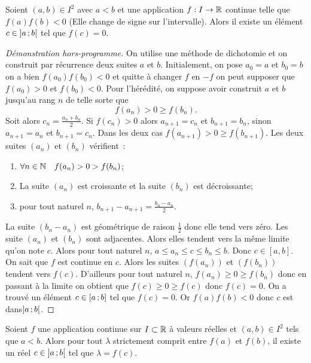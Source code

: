 \begin{theo}
  Soient \((a,b) \in I^2\) avec \(a<b\) et une application \(f:I\rightarrow \mathbb{R}\)
  continue telle que \(f(a) f(b) < 0\) (Elle change de signe sur l'intervalle).
  Alors il existe un élément \(c \in \left] a \, ; {} b \right[\) tel que \(f(c)=0\).
\end{theo}
\begin{proof}[Démonstration hors-programme]
  On utilise une méthode de dichotomie et on construit par récurrence deux
  suites \(a\) et \(b\). Initialement, on pose \(a_0=a\) et \(b_0=b\) on a bien
  \(f(a_0)f(b_0) < 0\) et quitte à changer \(f\) en \(-f\) on peut supposer que
  \(f(a_0)>0\) et \(f(b_0)<0\). Pour l'hérédité, on suppose avoir construit
  \(a\) et \(b\) jusqu'au rang \(n\) de telle sorte que
  \begin{equation}
    f(a_n) > 0 \geqslant f(b_n).
  \end{equation}
  Soit alors \(c_n=\frac{a_n+b_n}{2}\). Si \(f(c_n) >0\) alors \(a_{n+1}=c_n\)
  et \(b_{n+1}=b_n\), sinon \(a_{n+1}=a_n\) et \(b_{n+1}=c_n\). Dans les deux
  cas \(f(a_{n+1})> 0 \geqslant f(b_{n+1})\). Les deux suites \((a_n)\) et
  \((b_n)\) vérifient~:
  \begin{enumerate}
    \item \(\forall n \in \mathbb{N} \quad f(a_n) > 0 > f(b_n)\);
    \item La suite \((a_n)\) est croissante et la suite \((b_n)\) est
      décroissante;
  \item pour tout naturel \(n\), \(b_{n+1}-a_{n+1}=\frac{b_n -a_n}{2}\).
  \end{enumerate}
  La suite \((b_n-a_n)\) est géométrique de raison \(\frac{1}{2}\) donc elle
  tend vers zéro. Les suite \((a_n)\) et \((b_n)\) sont adjacentes. Alors elles
  tendent vers la même limite qu'on note \(c\). Alors pour tout naturel \(n\),
  \(a\leqslant a_n \leqslant c \leqslant b_n \leqslant b\). Donc \(c \in
  [a,b]\). On sait que \(f\) est  continue en \(c\). Alors les suites
  \((f(a_n))\) et \((f(b_n))\) tendent vers \(f(c)\). D'ailleurs pour tout
  naturel \(n\), \(f(a_n) \geqslant 0 \geqslant f(b_n)\) donc en passant à la
  limite on obtient que \(f(c) \geqslant 0 \geqslant f(c)\) donc \(f(c)=0\). On
  a trouvé un élément \(c \in \left[ a \, ; {} b \right]\) tel que \(f(c)=0\). Or
  \(f(a)f(b) < 0\) donc \(c\) est dans\(\left] a \, ; {} b \right[\).
\end{proof}
\begin{cor}
  Soient \(f\) une application continue sur \(I \subset \mathbb{R}\) à valeurs réelles
  et \((a,b) \in I^2\) tels que \(a < b\). Alors pour tout \(\lambda\)
  strictement comprit entre \(f(a)\) et \(f(b)\), il existe un réel \(c \in
  \left] a \, ; {} b \right[\) tel que \(\lambda =f(c)\).
\end{cor}
